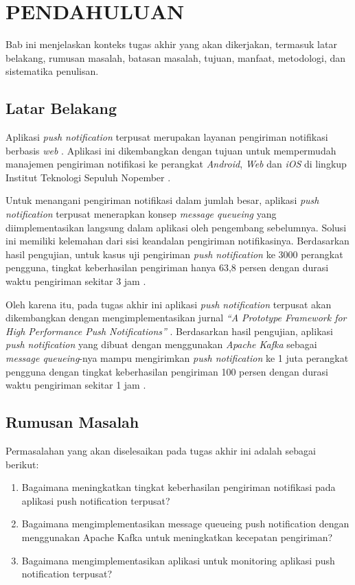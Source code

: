 \vspace{0ex}
\chapter {PENDAHULUAN}
\par Bab ini menjelaskan konteks tugas akhir yang akan dikerjakan, termasuk latar belakang, rumusan masalah, batasan masalah, tujuan, manfaat, metodologi, dan sistematika penulisan.

\section{Latar Belakang}
\par Aplikasi \textit{push notification} terpusat merupakan layanan pengiriman notifikasi berbasis \textit{web} \cite{application-thesis}. Aplikasi ini dikembangkan dengan tujuan untuk mempermudah manajemen pengiriman notifikasi ke perangkat \textit{Android}, \textit{Web} dan \textit{iOS} di lingkup Institut Teknologi Sepuluh Nopember \cite{application-thesis}.
\par Untuk menangani pengiriman notifikasi dalam jumlah besar, aplikasi \textit{push notification} terpusat menerapkan konsep \textit{message queueing} yang diimplementasikan langsung dalam aplikasi oleh pengembang sebelumnya. Solusi ini memiliki kelemahan dari sisi keandalan pengiriman notifikasinya. Berdasarkan hasil pengujian, untuk kasus uji pengiriman \textit{push notification} ke 3000 perangkat pengguna, tingkat keberhasilan pengiriman hanya 63,8 persen dengan durasi waktu pengiriman sekitar 3 jam \cite{application-thesis}.
\par Oleh karena itu, pada tugas akhir ini aplikasi \textit{push notification} terpusat akan dikembangkan dengan mengimplementasikan jurnal \textit{“A Prototype Framework for High Performance Push Notifications”} \cite{prototype-article}. Berdasarkan hasil pengujian, aplikasi \textit{push notification} yang dibuat dengan menggunakan \textit{Apache Kafka} sebagai \textit{message queueing}-nya mampu mengirimkan \textit{push notification} ke 1 juta perangkat pengguna dengan tingkat keberhasilan pengiriman 100 persen dengan durasi waktu pengiriman sekitar 1 jam \cite{prototype-article}.

\section {Rumusan Masalah}
Permasalahan yang akan diselesaikan pada tugas akhir ini adalah sebagai berikut:
\begin {enumerate}
\item Bagaimana meningkatkan tingkat keberhasilan pengiriman notifikasi pada aplikasi push notification terpusat?
\item Bagaimana mengimplementasikan message queueing push notification dengan menggunakan Apache Kafka untuk meningkatkan kecepatan pengiriman?
\item Bagaimana mengimplementasikan aplikasi untuk monitoring aplikasi push notification terpusat?
\end {enumerate}

